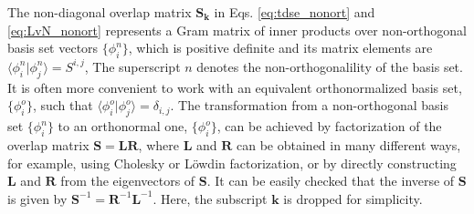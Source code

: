 \documentclass[journal=jctcce,manuscript=article,etalmode=truncate,maxauthors=10,layout=twocolumn,9pt]{achemso}   %
\begin{document}
The non-diagonal overlap matrix  $\mathbf { S_k}$ in Eqs. \ref{eq:tdse_nonort} and \ref{eq:LvN_nonort} represents a  Gram matrix of inner products 
 over non-orthogonal basis set vectors $\{  \phi_i^n \}$, which is positive definite  and
 its  matrix elements are
 $\langle \phi_i^n|  \phi_j^n  \rangle = S^{i,j}$, 
The  superscript $n$ denotes the non-orthogonalility of the basis set. 
It is often more convenient to work with an equivalent orthonormalized  basis set,  
$\{  \phi_i^o \}$,  such that  $\langle \phi_i^o|  \phi_j^o  \rangle =\delta_{i,j}$.
The transformation  from a non-orthogonal  basis set   $\{  \phi_i^n \}$ 
 to an  orthonormal one,    $\{  \phi_i^o \}$,  
 can be achieved by  factorization of the overlap matrix $\mathbf{ S}=\mathbf{LR}$,
 where $\mathbf L$ and $\mathbf R$  can be obtained in many different ways,
 for example, using  Cholesky or L\"owdin factorization, or by directly constructing $\mathbf L$ and $\mathbf R$ 
from the eigenvectors of $\mathbf S$. 
It can be easily checked that the inverse of $\mathbf S$ is  given by $\mathbf S^{-1}= \mathbf R^{-1} \mathbf L^{-1}$. 
Here, the  subscript $\mathbf k$ is dropped for simplicity. 
\end{document}
